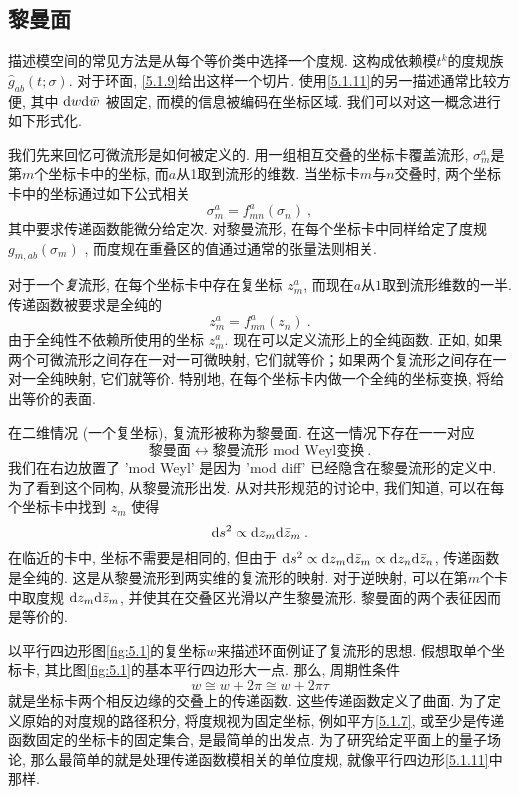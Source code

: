\subsection*{黎曼面}
描述模空间的常见方法是从每个等价类中选择一个度规. 这构成依赖模$t^{k}$的度规族$\hat{g}_{a b}(t ; \sigma)$. 对于环面, \eqref{5.1.9}给出这样一个切片. 
使用\eqref{5.1.11}的另一描述通常比较方便, 其中 $\mathrm{d} w \mathrm{d} \bar{w}$ 被固定, 而模的信息被编码在坐标区域. 我们可以对这一概念进行如下形式化.

我们先来回忆可微流形是如何被定义的. 用一组相互交叠的坐标卡覆盖流形,  $\sigma_{m}^{a}$是第$m$个坐标卡中的坐标, 而$a$从1取到流形的维数. 
当坐标卡$m$与$n$交叠时, 两个坐标卡中的坐标通过如下公式相关
\begin{equation}
	\sigma_{m}^{a}=f_{m n}^{a}(\sigma_{n}) \:, \label{5.2.12}
\end{equation}
其中要求传递函数能微分给定次. 对黎曼流形, 在每个坐标卡中同样给定了度规$g_{m, a b}(\sigma_{m})$ , 而度规在重叠区的值通过通常的张量法则相关.

对于一个\emph{复}流形, 在每个坐标卡中存在复坐标 $z_{m}^{a}$, 而现在$a$从$1$取到流形维数的一半. 传递函数被要求是全纯的
\begin{equation}
	z_{m}^{a}=f_{m n}^{a}(z_{n}) \:. \label{5.2.13}
\end{equation}
由于全纯性不依赖所使用的坐标 $z_{m}^{a}$. 现在可以定义流形上的全纯函数. 正如, 如果两个可微流形之间存在一对一可微映射, 它们就等价；如果两个复流形之间存在一对一全纯映射, 它们就等价. 特别地, 在每个坐标卡内做一个全纯的坐标变换, 将给出等价的表面.

在二维情况 (一个复坐标), 复流形被称为黎曼面. 在这一情况下存在一一对应
\begin{equation}
\text{黎曼面} \leftrightarrow \text{黎曼流形 mod Weyl变换} \:. \label{5.2.14}
\end{equation}
我们在右边放置了 'mod Weyl' 是因为 'mod diff' 已经隐含在黎曼流形的定义中. 为了看到这个同构, 从黎曼流形出发. 从对共形规范的讨论中, 我们知道, 
可以在每个坐标卡中找到 $z_{m}$ 使得
\begin{equation}
	\mathrm{d} s^{2} \propto \mathrm{d} z_{m} \mathrm{d} \bar{z}_{m} \:. \label{5.2.15}
\end{equation}
在临近的卡中, 坐标不需要是相同的, 但由于 $\mathrm{d} s^{2} \propto \mathrm{d} z_{m} \mathrm{d} \bar{z}_{m} \propto \mathrm{d} z_{n} \mathrm{d} \bar{z}_{n}$, 传递函数是全纯的. 
这是从黎曼流形到两实维的复流形的映射. 对于逆映射, 可以在第$m$个卡中取度规 $\mathrm{d} z_{m} \mathrm{d} \bar{z}_{m}$, 并使其在交叠区光滑以产生黎曼流形. 黎曼面的两个表征因而是等价的.

以平行四边形图\ref{fig:5.1}的复坐标$w$来描述环面例证了复流形的思想. 假想取单个坐标卡, 其比图\ref{fig:5.1}的基本平行四边形大一点. 那么, 周期性条件
\begin{equation}
	w \cong w+2 \pi \cong w+2 \pi \tau \label{5.2.16}
\end{equation}
就是坐标卡两个相反边缘的交叠上的传递函数. 这些传递函数定义了曲面. 为了定义原始的对度规的路径积分, 将度规视为固定坐标, 例如平方\eqref{5.1.7}, 或至少是传递函数固定的坐标卡的固定集合, 是最简单的出发点. 为了研究给定平面上的量子场论, 那么最简单的就是处理传递函数模相关的单位度规, 就像平行四边形\eqref{5.1.11}中那样.

